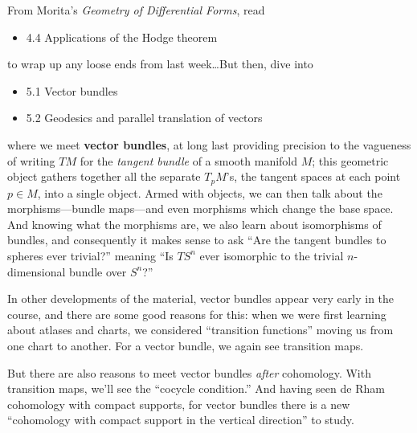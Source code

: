 \documentclass{homework}
\author{Jim Fowler}
\date{Week 11: Vector Bundles}
\begin{document}
\maketitle

From Morita's \textit{Geometry of Differential Forms}, read
\begin{itemize}
\item 4.4 Applications of the Hodge theorem
\end{itemize}
to wrap up any loose ends from last week\ldots But then, dive into
\begin{itemize}
\item 5.1 Vector bundles
\item 5.2 Geodesics and parallel translation of vectors
\end{itemize} where we meet \textbf{vector bundles}, at long last
providing precision to the vagueness of writing $TM$ for the
\textit{tangent bundle} of a smooth manifold $M$; this geometric
object gathers together all the separate $T_p M$'s, the tangent spaces
at each point $p \in M$, into a single object.  Armed with objects, we
can then talk about the morphisms---bundle maps---and even morphisms
which change the base space.  And knowing what the morphisms are, we
also learn about isomorphisms of bundles, and consequently it makes
sense to ask ``Are the tangent bundles to spheres ever trivial?''
meaning ``Is $TS^n$ ever isomorphic to the trivial $n$-dimensional
bundle over $S^n$?''

In other developments of the material, vector bundles appear very
early in the course, and there are some good reasons for this: when we
were first learning about atlases and charts, we considered
``transition functions'' moving us from one chart to another.  For a
vector bundle, we again see transition maps.

But there are also reasons to meet vector bundles \textit{after}
cohomology.  With transition maps, we'll see the ``cocycle
condition.''  And having seen de Rham cohomology with compact
supports, for vector bundles there is a new ``cohomology with compact
support in the vertical direction'' to study.
\end{document}
